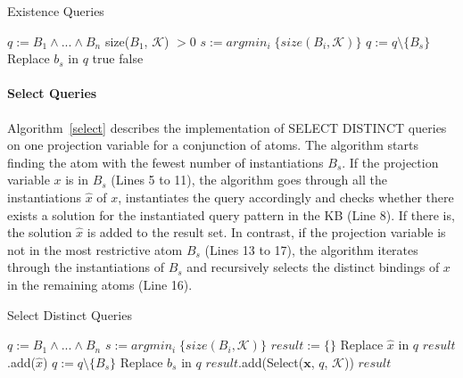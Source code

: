 \begin{algorithm}
\caption{Existence Queries}
\label{exists}
\begin{algorithmic}[1]
    \State $q := B_1 \wedge ... \wedge B_n$
      \State \Return size($B_1$, $\mathcal{K}$) $> 0$
    \Else
      \State $s := argmin_i\;\{ size(B_i, \mathcal{K}) \}$
      \State $q := q \setminus \{ B_s \} $
	\State Replace $b_s$ in $q$
	    \State \Return true
	  \EndIf
      \EndFor
    \EndIf
    \State \Return false
\EndFunction
\end{algorithmic}
\end{algorithm}

\paragraph{Select Queries} 
Algorithm~\ref{select} describes the implementation of SELECT DISTINCT queries on one projection variable for a conjunction of
atoms. 
The algorithm starts finding the atom with the fewest number 
of instantiations $B_s$. If the projection variable $x$ is in $B_s$ (Lines 5 to 11), 
the algorithm goes through all the instantiations $\hat{x}$ of $x$, instantiates
the query accordingly and checks whether there exists a solution for the instantiated query pattern in the KB (Line 8). 
If there is, the solution $\hat{x}$ is added to the result set. In contrast, if the projection variable is not in the most 
restrictive atom $B_s$ (Lines 13 to 17), the algorithm iterates through the instantiations of $B_s$ and recursively selects the distinct
bindings of $x$ in the remaining atoms (Line 16).

\begin{algorithm}
\caption{Select Distinct Queries}
\label{select}
\begin{algorithmic}[1]
    \State $q := B_1 \wedge ... \wedge B_n$
    \State $s := argmin_i\;\{ size(B_i, \mathcal{K}) \}$
    \State $result := \lbrace \rbrace$
	\State Replace $\hat{x}$ in $q$
	  \State $result$.add($\hat{x}$)
	\EndIf
      \EndFor
    \Else
      \State $q := q \setminus \{ B_s\}$
      	\State Replace $b_s$ in $q$
      	\State $result$.add(Select($\bm{x}$, $q$, $\mathcal{K}$))
      \EndFor
    \EndIf
    \State \Return $result$
\EndFunction
\end{algorithmic}
\end{algorithm}

